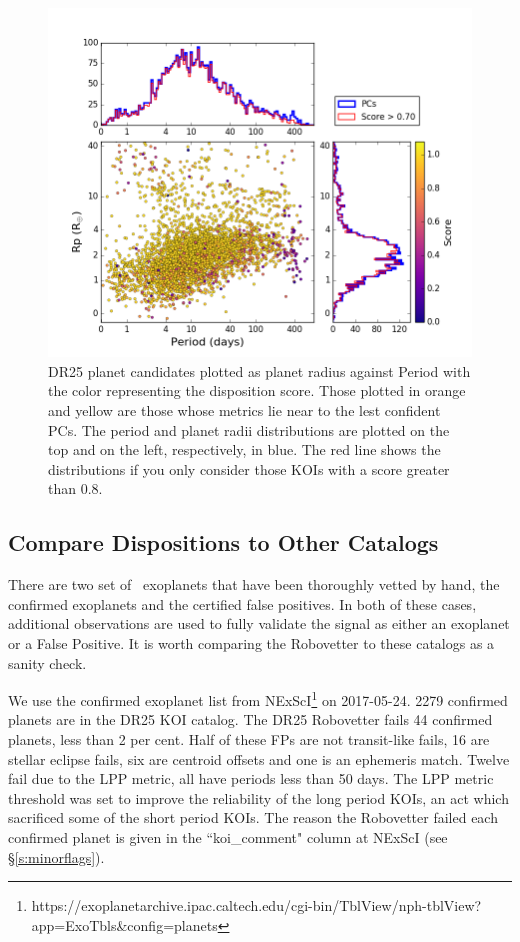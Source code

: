 \begin{figure}
    \centering
    \includegraphics[width=1.1\linewidth]{fig-radiusPeriodScore-hist.png}
    \caption{DR25 planet candidates plotted as planet radius against Period with the color representing the disposition score. Those plotted in orange and yellow are those whose metrics lie near to the lest confident PCs.  The period and planet radii distributions are plotted on the top and on the left, respectively, in blue. The red line shows the distributions if you only consider those KOIs with a score greater than 0.8. }
    \label{f:catalogPlot}
\end{figure}

\subsection{Compare Dispositions to Other Catalogs}
There are two set of \Kepler\ exoplanets that have been thoroughly vetted by hand, the confirmed exoplanets and the certified false positives.  In both of these cases, additional observations are used to fully validate the signal as either an exoplanet or a False Positive. It is worth comparing the Robovetter to these catalogs as a sanity check.  

We use the confirmed exoplanet list from NExScI\footnote{https://exoplanetarchive.ipac.caltech.edu/cgi-bin/TblView/nph-tblView?app=ExoTbls\&config=planets} on 2017-05-24.  2279 confirmed planets are in the DR25 KOI catalog.  The DR25 Robovetter fails 44 confirmed planets, less than 2 per cent. Half of these FPs are not transit-like fails, 16 are stellar eclipse fails, six are centroid offsets and one is an ephemeris match. Twelve fail due to the LPP metric, all have periods less than 50 days.  The LPP metric threshold was set to improve the reliability of the long period KOIs, an act which sacrificed some of the short period KOIs.  The reason the Robovetter failed each confirmed planet is given in the ``koi\_comment" column at NExScI (see \S\ref{s:minorflags}). 

